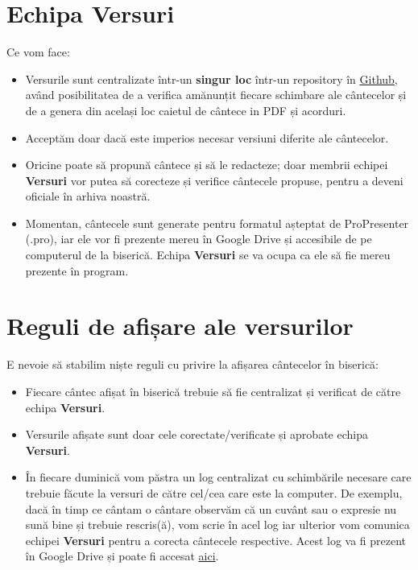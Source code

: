 \documentclass[epjST]{svjour}
\begin{document}
  \section{Echipa Versuri}
  \label{sec:4} Ce vom face:
  \begin{itemize}
    \item Versurile sunt centralizate într-un \textbf{singur loc} într-un
      repository în \href{https://github.com/ioanlucut/bes-lyrics}{Github}, având
      posibilitatea de a verifica amănunțit fiecare schimbare ale cântecelor și de
      a genera din același loc caietul de cântece in PDF și acorduri.

    \item Acceptăm doar dacă este imperios necesar versiuni diferite ale cântecelor.

    \item Oricine poate să propună cântece și să le redacteze; doar membrii
      echipei \textbf{Versuri} vor putea să corecteze și verifice cântecele propuse,
      pentru a deveni oficiale în arhiva noastră.

    \item Momentan, cântecele sunt generate pentru formatul așteptat de
      ProPresenter (.pro), iar ele vor fi prezente mereu în Google Drive și
      accesibile de pe computerul de la biserică. Echipa \textbf{Versuri} se va
      ocupa ca ele să fie mereu prezente în program.
  \end{itemize}

  \section{Reguli de afișare ale versurilor}
  \label{sec:5} E nevoie să stabilim niște reguli cu privire la afișarea
  cântecelor în biserică:
  \begin{itemize}
    \item Fiecare cântec afișat în biserică trebuie să fie centralizat și verificat
      de către echipa \textbf{Versuri}.

    \item Versurile afișate sunt doar cele corectate/verificate și aprobate echipa
      \textbf{Versuri}.

    \item În fiecare duminică vom păstra un log centralizat cu schimbările necesare
      care trebuie făcute la versuri de către cel/cea care este la computer. De
      exemplu, dacă în timp ce cântam o cântare observăm că un cuvânt sau o expresie
      nu sună bine și trebuie rescris(ă), vom scrie în acel log iar ulterior vom
      comunica echipei \textbf{Versuri} pentru a corecta cântecele respective. Acest
      log va fi prezent în Google Drive și poate fi accesat \href{https://docs.google.com/spreadsheets/d/1-YsjtGIwzpnJNoVPZ4vhv8DvmeUYrmwuhKL6a5BtzXc/edit?usp=drive_link}{aici}.
  \end{itemize}
\end{document}
